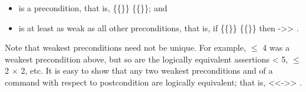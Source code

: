 \documentclass[12pt]{report}
\begin{document}
\begin{itemize}
\item  {} is a precondition, that is, \{\{\}\}  \{\{\}\}; and

\item  {} is at least as weak as all other preconditions, that is,
        if \{\{\}\}  \{\{\}\} then  ->> .

\end{itemize}
 

 Note that weakest preconditions need not be unique.  For
    example,  \ensuremath{\le} 4 was a weakest precondition above, but so are the
    logically equivalent assertions  < 5,  \ensuremath{\le} 2 \ensuremath{\times} 2, etc.
    It is easy to show that any two weakest preconditions  and 
    of a command  with respect to postcondition  are logically
    equivalent; that is,  <<->> . 
\end{document}
